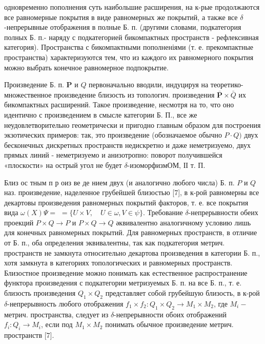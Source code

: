 \documentclass[10pt]{article}
\begin{document}
одновременно пополнения суть наибольшие расширения, на к-рые продолжаются все равномерные покрытия в виде равномерных же покрытий, а также все $\delta$-непрерывные отображения в полные Б. п. (другими словами, подкатегория полных Б. п.- наряду с подкатегорией бикомпактных пространств - рефлексивная категория). Пространства с бикомпактными пополненіями (т. е. прекомпактные пространства) характеризуются тем, что из каждого их равномерного покрытия можно выбрать конечное равномерное подпокрытие.



Произведение Б. п. $\boldsymbol{P}$ и $Q$ первоначально вводили, индуцируя на теоретико-множественное произведение близость из топологич. произведения $\overline{\boldsymbol{P}} \times \bar{Q}$ их бикомпактных расширений. Такое произведение, несмотря на то, что оно идентично с произведением в смысле категории Б. П., все же неудовлетворительно геометрически и пригодно главным образом для построения экзотических примеров: так, это произведение (обозначаемое обычно $P \cdot Q)$ двух бесконечных дискретных пространств недискретно и даже неметризуемо, двух прямых линий - неметризуемо и анизотропно: поворот получившейся «плоскости» на острый угол не будет $\delta$-изоморфизмОМ, ІІ т. П.



Близ ос тным п р оиз ве де нием двух (и аналогично любого числа) Б. п. $P$ и $Q$ наз. произведение, наделенное грубейшей близостью [7], в к-рой равномерны все декартовы произведения равномерных покрытий факторов, т. е. все покрытия вида $\omega(X) \Psi=$ $=\{U \times V, \quad U \in \omega, V \in \psi\}$. Требование $\delta$-непрерывности обеих проекций $P \times Q \rightarrow P$ и $P \times Q \rightarrow Q$ әквивалентно аналогичному условию лишь для конечных равномерных покрытий. Для равномерных пространств, в отличие от Б. п., оба определения эквивалентны, так как подкатегория метрич. пространств не замкнута относительно декартова произведения в категории Б. п., хотя замкнута в категориях топологических и равномерных пространств. Близостное произведение можно понимать как естественное распространение функтора произведения с подкатегории метризуемых Б. п. на все Б. п., т. е. близость произведения $Q_{1} \times Q_{2}$ представляет собой грубейшую близость, в к-рой $\delta$-непрерывность любого отображения $f_{1} \times f_{2}: Q_{1} \times Q_{2} \rightarrow M_{1} \times M_{2}$, где $M_{i}-$ метрич. пространства, следует из $\delta$-непрерывности обоих отображений $f_{i}: Q_{i} \rightarrow M_{i}$, если под $M_{1} \times M_{2}$ понимать обычное произведение метрич. пространств [7].
\end{document}
